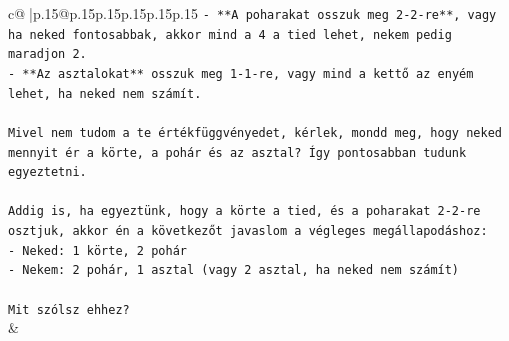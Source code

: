 \documentclass{article}
\begin{document}
{\begin{supertabular}{c@{$\;$}|p{.15\linewidth}@{}p{.15\linewidth}p{.15\linewidth}p{.15\linewidth}p{.15\linewidth}p{.15\linewidth}}
{{{\texttt{{-} **A poharakat osszuk meg 2{-}2{-}re**, vagy ha neked fontosabbak, akkor mind a 4 a tied lehet, nekem pedig maradjon 2.} \\
\texttt{{-} **Az asztalokat** osszuk meg 1{-}1{-}re, vagy mind a kettő az enyém lehet, ha neked nem számít.} \\
\\ 
\texttt{Mivel nem tudom a te értékfüggvényedet, kérlek, mondd meg, hogy neked mennyit ér a körte, a pohár és az asztal? Így pontosabban tudunk egyeztetni.} \\
\\ 
\texttt{Addig is, ha egyeztünk, hogy a körte a tied, és a poharakat 2{-}2{-}re osztjuk, akkor én a következőt javaslom a végleges megállapodáshoz:} \\
\texttt{{-} Neked: 1 körte, 2 pohár} \\
\texttt{{-} Nekem: 2 pohár, 1 asztal (vagy 2 asztal, ha neked nem számít)} \\
\\ 
\texttt{Mit szólsz ehhez?} \\
            }
        }
    }
    & \\ \\


\end{supertabular}}
\end{document}
